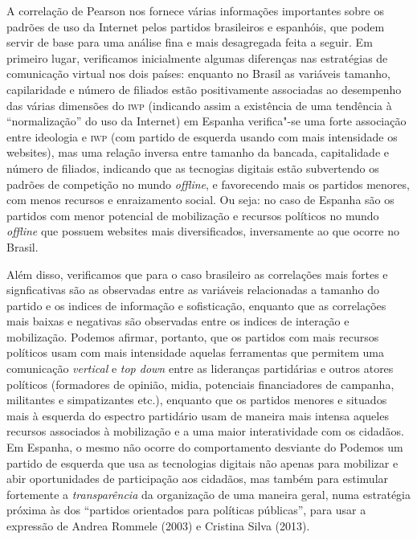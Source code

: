 A correlação de Pearson nos fornece várias informações
importantes sobre os padrões de uso da Internet pelos partidos
brasileiros e espanhóis, que podem servir de base para uma análise fina
e mais desagregada feita a seguir. Em primeiro lugar, verificamos
inicialmente algumas diferenças nas estratégias de comunicação virtual
nos dois países: enquanto no Brasil as variáveis tamanho, capilaridade e
número de filiados estão positivamente associadas ao desempenho das
várias dimensões do \textsc{iwp} (indicando assim a existência de uma tendência à
``normalização'' do uso da Internet) em Espanha verifica"-se uma forte
associação entre ideologia e \textsc{iwp} (com partido de esquerda usando com
mais intensidade os websites), mas uma relação inversa entre tamanho da
bancada, capitalidade e número de filiados, indicando que as tecnogias
digitais estão subvertendo os padrões de competição no mundo \textit{offline}, e
favorecendo mais os partidos menores, com menos recursos e enraizamento
social. Ou seja: no caso de Espanha são os partidos com menor potencial
de mobilização e recursos políticos no mundo \textit{offline} que possuem
websites mais diversificados, inversamente ao que ocorre no Brasil.

Além disso, verificamos que para o caso brasileiro as correlações mais
fortes e signficativas são as observadas entre as variáveis relacionadas
a tamanho do partido e os indices de informação e sofisticação, enquanto
que as correlações mais baixas e negativas são observadas entre os
indices de interação e mobilização. Podemos afirmar, portanto, que os
partidos com mais recursos políticos usam com mais intensidade aquelas
ferramentas que permitem uma comunicação \textit{vertical} e \textit{top down} entre
as lideranças partidárias e outros atores políticos (formadores de
opinião, midia, potenciais financiadores de campanha, militantes e
simpatizantes etc.), enquanto que os partidos menores e situados mais à
esquerda do espectro partidário usam de maneira mais intensa aqueles
recursos associados à mobilização e a uma maior interatividade com os
cidadãos. Em Espanha, o mesmo não ocorre do comportamento desviante do
Podemos um partido de esquerda que usa as tecnologias digitais
não apenas para mobilizar e abir oportunidades de participação aos
cidadãos, mas também para estimular fortemente a \textit{transparência} da
organização de uma maneira geral, numa estratégia próxima às dos
``partidos orientados para políticas públicas'', para usar a expressão
de Andrea Rommele (2003) e Cristina Silva (2013).

